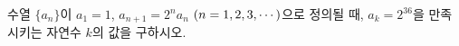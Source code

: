 수열 $\{a_n\}$이 $a_1=1$, $a_{n+1}=2^na_n$ $(n=1{,}\mkern3mu\mathopen{}2{,}\mkern3mu\mathopen{}3{,}\mkern3mu\mathopen{}\cdots)$으로 정의될 때, $a_k=2^{36}$을 만족시키는 자연수 $k$의 값을 구하시오.
